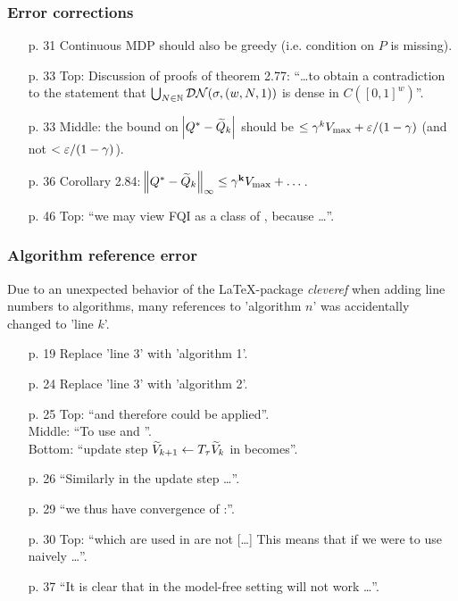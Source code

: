 \documentclass{beamer}[10]
\begin{document}
\begin{frame}
  \frametitle{Error corrections}
  \begingroup
  \footnotesize
  \begin{itemize}
    \item[p. 31] Continuous MDP should also be greedy (i.e. condition on $P$
      is missing).
    \item[p. 33] Top: Discussion of proofs of theorem 2.77:
      ``\ldots to obtain a contradiction to the statement that
      $\bigcup_{N \in \mathbb{N}} \mathcal{DN}(\sigma, (w,N,1))$
      is  dense in $C([0,1]^w)$''.
    \item[p. 33] Middle: the bound on $\abs{Q^* - \widetilde{Q}_k}$ should be
      $\leq \gamma^k V_{\max} + \varepsilon / (1-\gamma)$ (and not 
      $< \varepsilon / (1-\gamma)$).
    \item[p. 36] Corollary 2.84: $\norm{Q^* - \widetilde{Q}_k}_\infty \leq \gamma^{
      \mathbf{k}} V_{\max} + \dots$.
    \item[p. 46] Top: ``we may view FQI as a class of ,
      because \ldots''.
  \end{itemize}
  \endgroup
\end{frame}

\begin{frame}
  \frametitle{Algorithm reference error}
  \begingroup
  \footnotesize
  Due to an unexpected behavior of the \LaTeX-package \emph{cleveref}
  when adding line
  numbers to algorithms, many references to 'algorithm $n$'
  was accidentally changed to 'line $k$'.
  \begin{itemize}
    \item[p. 19] 
      Replace 'line 3' with 'algorithm 1'.
    \item[p. 24]
      Replace 'line 3' with 'algorithm 2'.
    \item[p. 25]
      Top: ``and therefore  could be applied''.
      \\Middle: ``To use  and ''.
      \\ Bottom: ``update step $\widetilde{V}_{k+1} \leftarrow T_\tau \widetilde{V}_k$ 
      in  becomes''.
    \item[p. 26] ``Similarly in  the update step \ldots''.
    \item[p. 29] ``we thus have convergence of :''.
    \item[p. 30] Top: ``which are used in  are not [\ldots]
      This means that if we were to use  naively \ldots''.
    \item[p. 37] ``It is clear that in the model-free setting  will not work \ldots''.
  \end{itemize}
  \endgroup
\end{frame}
\end{document}
